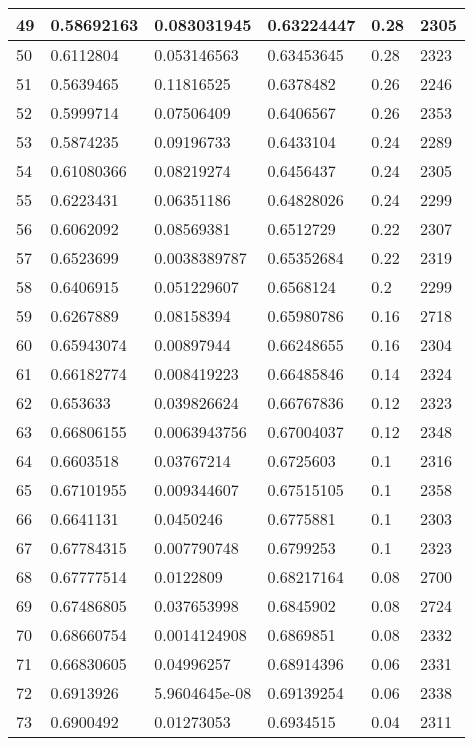 \begin{longtable}{|l|l|l|l|l|l|}
49 & 0.58692163 & 0.083031945 & 0.63224447 & 0.28 & 2305 \\ \hline 
50 & 0.6112804 & 0.053146563 & 0.63453645 & 0.28 & 2323 \\ \hline 
51 & 0.5639465 & 0.11816525 & 0.6378482 & 0.26 & 2246 \\ \hline 
52 & 0.5999714 & 0.07506409 & 0.6406567 & 0.26 & 2353 \\ \hline 
53 & 0.5874235 & 0.09196733 & 0.6433104 & 0.24 & 2289 \\ \hline 
54 & 0.61080366 & 0.08219274 & 0.6456437 & 0.24 & 2305 \\ \hline 
55 & 0.6223431 & 0.06351186 & 0.64828026 & 0.24 & 2299 \\ \hline 
56 & 0.6062092 & 0.08569381 & 0.6512729 & 0.22 & 2307 \\ \hline 
57 & 0.6523699 & 0.0038389787 & 0.65352684 & 0.22 & 2319 \\ \hline 
58 & 0.6406915 & 0.051229607 & 0.6568124 & 0.2 & 2299 \\ \hline 
59 & 0.6267889 & 0.08158394 & 0.65980786 & 0.16 & 2718 \\ \hline 
60 & 0.65943074 & 0.00897944 & 0.66248655 & 0.16 & 2304 \\ \hline 
61 & 0.66182774 & 0.008419223 & 0.66485846 & 0.14 & 2324 \\ \hline 
62 & 0.653633 & 0.039826624 & 0.66767836 & 0.12 & 2323 \\ \hline 
63 & 0.66806155 & 0.0063943756 & 0.67004037 & 0.12 & 2348 \\ \hline 
64 & 0.6603518 & 0.03767214 & 0.6725603 & 0.1 & 2316 \\ \hline 
65 & 0.67101955 & 0.009344607 & 0.67515105 & 0.1 & 2358 \\ \hline 
66 & 0.6641131 & 0.0450246 & 0.6775881 & 0.1 & 2303 \\ \hline 
67 & 0.67784315 & 0.007790748 & 0.6799253 & 0.1 & 2323 \\ \hline 
68 & 0.67777514 & 0.0122809 & 0.68217164 & 0.08 & 2700 \\ \hline 
69 & 0.67486805 & 0.037653998 & 0.6845902 & 0.08 & 2724 \\ \hline 
70 & 0.68660754 & 0.0014124908 & 0.6869851 & 0.08 & 2332 \\ \hline 
71 & 0.66830605 & 0.04996257 & 0.68914396 & 0.06 & 2331 \\ \hline 
72 & 0.6913926 & 5.9604645e-08 & 0.69139254 & 0.06 & 2338 \\ \hline 
73 & 0.6900492 & 0.01273053 & 0.6934515 & 0.04 & 2311 \\ \hline 

\end{longtable}
